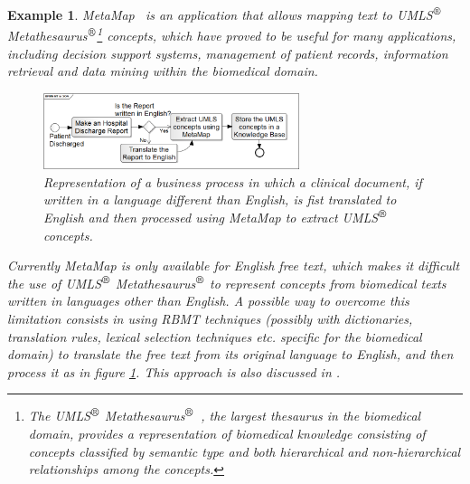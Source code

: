 \documentclass[11pt]{article}
\newtheorem{ex}[theo]{Example}
\begin{document}
\begin{ex}
MetaMap~\citep{metamap} is an application that allows mapping text to UMLS$^{\mbox{\small\textregistered}}$ 
Metathesaurus$^{\mbox{\small\textregistered}}$\footnote{The UMLS$^{\mbox{\small\textregistered}}$ Metathesaurus$^{\mbox{\small\textregistered}}$~\citep{umls}, 
the largest thesaurus in the biomedical domain, provides a representation of biomedical knowledge consisting of concepts classified by semantic 
type and both hierarchical and non-hierarchical relationships among the concepts.} concepts, which have proved to be useful for many applications, 
including decision support systems, management of patient records, information retrieval and data mining within the biomedical domain.

\begin{figure}[!ht]
\begin{center}
\includegraphics[width=7.5cm]{mtsoa}
\end{center}
\caption{Representation of a business process in which a clinical document, if written in a language different than English, is fist translated
  to English and then processed using MetaMap to extract UMLS$^{\mbox{\small\textregistered}}$ concepts.}
\label{fig:mtsoa}
\end{figure}

Currently MetaMap is only available for English free text, which makes it difficult the use of UMLS$^{\mbox{\small\textregistered}}$ 
Metathesaurus$^{\mbox{\small\textregistered}}$ to represent concepts from biomedical texts written in languages other than English.
A possible way to overcome this limitation consists in using RBMT techniques (possibly with dictionaries, translation rules, 
lexical selection techniques etc. specific for the biomedical domain) to translate the free text from its original language 
to English, and then process it as in figure \ref{fig:mtsoa}. This approach is also discussed in .
\end{ex}
\end{document}
